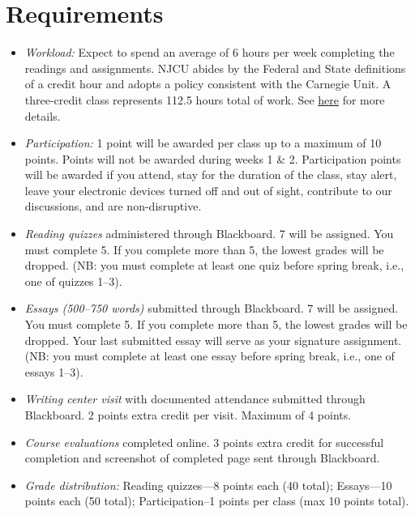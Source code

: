 \documentclass[article,oneside]{memoir}
\begin{document}
\section{Requirements}

\begin{itemize}
\item \textit{Workload:} Expect to spend an average of 6 hours per week completing the readings and assignments. NJCU abides by the Federal and State definitions of a credit hour and adopts a policy consistent with the Carnegie Unit. A three-credit class represents 112.5 hours total of work. See \href{http://scottoconnor.org/resources/Credit.pdf}{here} for more details.

\item \textit{Participation:}  1 point will be awarded per class up to a maximum of 10 points. Points will not be awarded during weeks 1 \& 2. Participation points will be awarded if you attend, stay for the duration of the class, stay alert, leave your electronic devices turned off and out of sight, contribute to our discussions, and are non-disruptive. 

\item \textit{Reading quizzes} administered through Blackboard. 7 will be assigned. You must complete 5. If you complete more than 5, the lowest grades will be dropped. (NB: you must complete at least one quiz before spring break, i.e., one of quizzes 1--3).

\item \textit{Essays (500--750 words)} submitted through Blackboard. 7 will be assigned. You must complete 5. If you complete more than 5, the lowest grades will be dropped. Your last submitted essay will serve as your signature assignment. (NB: you must complete at least one essay before spring break, i.e., one of essays 1--3).

\item \textit{Writing center visit} with documented attendance submitted through Blackboard. 2 points extra credit per visit. Maximum of 4 points.  


\item \textit{Course evaluations} completed online. 3 points extra credit for successful completion and screenshot of completed page sent through Blackboard. 
  
\item \textit{Grade distribution:} Reading quizzes---8 points each (40 total);  Essays---10 points each (50 total); Participation--1 points per class (max 10 points total). 



\end{itemize}
\end{document}
